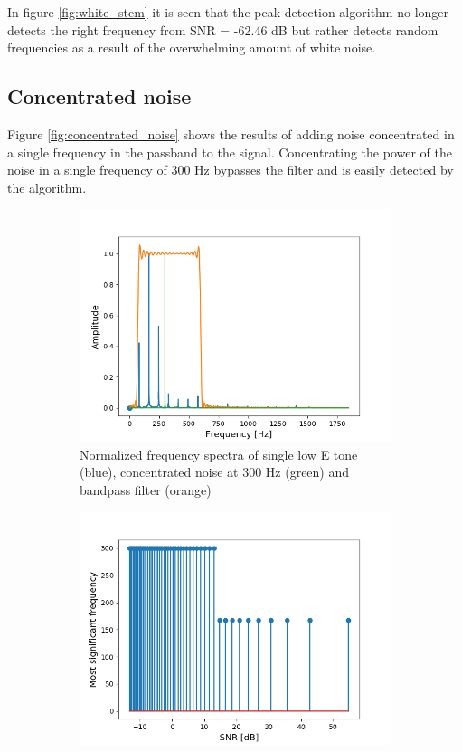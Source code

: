 In figure \ref{fig:white_stem} it is seen that the peak detection algorithm no longer detects the right frequency from SNR = -62.46 dB but rather detects random frequencies as a result of the overwhelming amount of white noise.

\subsection{Concentrated noise}
Figure \ref{fig:concentrated_noise} shows the results of adding noise concentrated in a single frequency in the passband to the signal. Concentrating the power of the noise in a single frequency of 300 Hz bypasses the filter and is easily detected by the algorithm.

\begin{figure}[H]
\begin{subfigure}{0.49\textwidth}
\centering
\includegraphics[width=\textwidth]{figures/SNR/concentrated_spectrum.png}
\caption{Normalized frequency spectra of single low E tone (blue), concentrated noise at 300 Hz (green) and bandpass filter (orange)}
\label{fig:concentrated_spectrum}
\end{subfigure}
\begin{subfigure}{0.49\textwidth}
\centering
\includegraphics[width=\textwidth]{figures/SNR/concentrated_stem.png}

\end{subfigure}
\end{figure}
